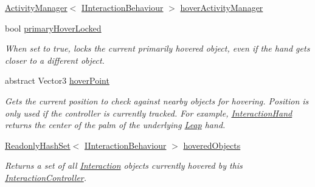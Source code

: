 \begin{DoxyCompactItemize}
\mbox{\hyperlink{class_leap_1_1_unity_1_1_interaction_1_1_activity_manager}{Activity\+Manager}}$<$ \mbox{\hyperlink{interface_leap_1_1_unity_1_1_interaction_1_1_i_interaction_behaviour}{I\+Interaction\+Behaviour}} $>$ \mbox{\hyperlink{class_leap_1_1_unity_1_1_interaction_1_1_interaction_controller_a1c4c17da6cee8659687cf864381f1473}{hover\+Activity\+Manager}}
\item 
bool \mbox{\hyperlink{class_leap_1_1_unity_1_1_interaction_1_1_interaction_controller_afa44de31d034ff2bceb41ee6a20d0253}{primary\+Hover\+Locked}}
\begin{DoxyCompactList}\small\item\em When set to true, locks the current primarily hovered object, even if the hand gets closer to a different object. \end{DoxyCompactList}\item 
abstract Vector3 \mbox{\hyperlink{class_leap_1_1_unity_1_1_interaction_1_1_interaction_controller_a7c2b239ce82be01d82b7d8305dbfe0e5}{hover\+Point}}
\begin{DoxyCompactList}\small\item\em Gets the current position to check against nearby objects for hovering. Position is only used if the controller is currently tracked. For example, \mbox{\hyperlink{class_leap_1_1_unity_1_1_interaction_1_1_interaction_hand}{Interaction\+Hand}} returns the center of the palm of the underlying \mbox{\hyperlink{namespace_leap_1_1_unity_1_1_leap}{Leap}} hand. \end{DoxyCompactList}\item 
\mbox{\hyperlink{struct_leap_1_1_unity_1_1_readonly_hash_set}{Readonly\+Hash\+Set}}$<$ \mbox{\hyperlink{interface_leap_1_1_unity_1_1_interaction_1_1_i_interaction_behaviour}{I\+Interaction\+Behaviour}} $>$ \mbox{\hyperlink{class_leap_1_1_unity_1_1_interaction_1_1_interaction_controller_a37ded7f3535bc34b8a9c6c2337e4eb6d}{hovered\+Objects}}
\begin{DoxyCompactList}\small\item\em Returns a set of all \mbox{\hyperlink{namespace_leap_1_1_unity_1_1_interaction}{Interaction}} objects currently hovered by this \mbox{\hyperlink{class_leap_1_1_unity_1_1_interaction_1_1_interaction_controller}{Interaction\+Controller}}. \end{DoxyCompactList}\item 

\end{DoxyCompactItemize}
